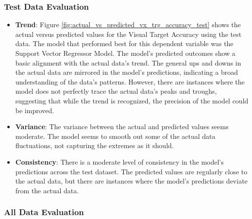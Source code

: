\subsubsection*{Test Data Evaluation}

\begin{itemize}
    \item \textbf{Trend}: Figure \ref{fig:actual_vs_predicted_vx_trg_accuracy_test} shows the actual versus predicted values for the Visual Target Accuracy using the test data. The model that performed
          best for this dependent variable was the Support Vector Regressor Model. The model's predicted outcomes show a basic alignment with the actual data's trend. The general ups and downs in the actual data are
          mirrored in the model's predictions, indicating a broad understanding of the data's patterns. However, there are instances where the model does not perfectly trace the actual data's peaks and troughs,
          suggesting that while the trend is recognized, the precision of the model could be improved.

    \item \textbf{Variance}: The variance between the actual and predicted values seems moderate. The model seems to smooth out some of the actual data fluctuations, not capturing the extremes as it should.

    \item \textbf{Consistency}: There is a moderate level of consistency in the model's predictions across the test dataset. The predicted values are regularly close to the actual data, but 
            there are instances where the model's predictions deviate from the actual data. 
\end{itemize}

\subsubsection*{All Data Evaluation}

